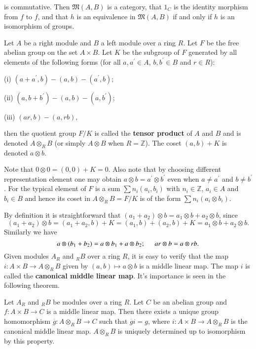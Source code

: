 is commutative. Then $\mathfrak{M}(A,B)$ is a category, that $1_C$ is the identity morphism from $f$ to $f$, and that $h$ is an equivalence in $\mathfrak{M}(A,B)$ if and only if $h$ is an isomorphism of groups.
\begin{definition}
Let $A$ be a right module and $B$ a left module over a ring $R$. Let $F$ be the free abelian group on the set $A\times B$. Let $K$ be the subgroup of $F$ generated by all elements of the following forms (for all $a,a^\prime\in A$, $b,b^\prime\in B$ and $r\in R$):\par
(i) $\left( a+a^{\prime},b \right) -\left( a,b \right) -\left( a^{\prime},b \right) ;$\par
(ii) $\left( a,b+b^{\prime} \right) -\left( a,b \right) -\left( a,b^{\prime} \right) ;$\par
(iii) $\left( ar,b \right) -\left( a,rb \right) ,$\par
then the quotient group $F/K$ is called the \textbf{tensor product} of $A$ and $B$ and is denoted $A\otimes_RB$ (or simply $A\otimes B$ when $R=\mathbb{Z}$). The coset $(a,b)+K$ is denoted $a\otimes b$.
\end{definition}
Note that $0\otimes 0=(0,0)+K=0$. Also note that by choosing different representation element one may obtain $a\otimes b=a^\prime\otimes b^\prime$ even when $a\ne a^\prime$ and $b\ne b^\prime$. For the typical element of $F$ is a sum $\sum n_i(a_i,b_i)$ with $n_i\in\mathbb{Z}$, $a_i\in A$ and $b_i\in B$ and hence its coset in $A\otimes_RB=F/K$ is of the form $\sum n_i(a_i\otimes b_i)$.\par
By definition it is straightforward that $(a_1+a_2)\otimes b=a_1\otimes b+a_2\otimes b$, since 
$$
\left( a_1+a_2 \right) \otimes b=\left( a_1+a_2,b \right) +K=\left( a_1,b \right) +\left( a_2,b \right) +K=a_1\otimes b+a_2\otimes b.
$$
Similarly we have 
$$a\otimes(b_1+b_2)=a\otimes b_1+a\otimes b_2;\hspace{0.5cm}ar\otimes b=a\otimes rb.$$
Given modules $A_R$ and $_RB$ over a ring $R$, it is easy to verify that the map $i:A\times B\to A\otimes_RB$ given by $(a,b)\mapsto a\otimes b$ is a middle linear map. The map $i$ is called the \textbf{canonical middle linear map}. It's importance is seen in the following theorem.
\begin{theorem}
Let $A_R$ and $_RB$ be modules over a ring $R$. Let $C$ be an abelian group and $f:A\times B\to C$ is a middle linear map. Then there exists a unique group homomorphism $\overline{g}:A\otimes_RB\to C$ such that $\overline{g}i=g$, where $i:A\times B\to A\otimes_RB$ is the canonical middle linear map. $A\otimes_RB$ is uniquely determined up to isomorphism by this property.
\end{theorem}
